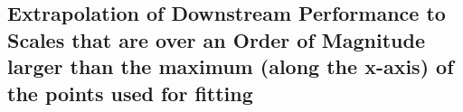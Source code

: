 \documentclass{article} %
\begin{document}
\fi

\clearpage

\subsection{Extrapolation of Downstream Performance to Scales that are over an Order of Magnitude larger than the maximum (along the x-axis) of the points used for fitting}
\label{section:extrapolate_oom}
\end{document}
